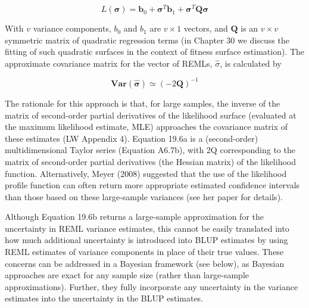 \documentclass{article}
\begin{document}
\begin{equation}
L(\boldsymbol{\sigma})=\mathbf{b}_{0}+\boldsymbol{\sigma}^{T}\mathbf{b}_{1}+\boldsymbol{\sigma}^{T}\mathbf{Q}\boldsymbol{\sigma}
\tag{19.6a}
\label{eq:19_6a}
\end{equation}

With $v$ variance components, $b_0$ and $b_1$ are $v \times 1$ vectors, and $\mathbf{Q}$ is an $v \times v$ symmetric matrix of quadratic regression terms (in Chapter 30 we discuss the fitting of such quadratic surfaces in the context of fitness surface estimation). The approximate covariance matrix for the vector of REMLs, $\widehat{\sigma}$, is calculated by

\begin{equation}
\mathbf{V a r}(\widehat{\boldsymbol{\sigma}})\simeq(-2\mathbf{Q})^{-1}
\tag{19.6b}
\label{eq:19_6b}
\end{equation}

The rationale for this approach is that, for large samples, the inverse of the matrix of second-order partial derivatives of the likelihood surface (evaluated at the maximum likelihood estimate, MLE) approaches the covariance matrix of these estimates (LW Appendix 4). Equation 19.6a is a (second-order) multidimensional Taylor series (Equation A6.7b), with 2Q corresponding to the matrix of second-order partial derivatives (the Hessian matrix) of the likelihood function. Alternatively, Meyer (2008) suggested that the use of the likelihood profile function can often return more appropriate estimated confidence intervals than those based on these large-sample variances (see her paper for details).

Although Equation 19.6b returns a large-sample approximation for the uncertainty in REML variance estimates, this cannot be easily translated into how much additional uncertainty is introduced into BLUP estimates by using REML estimates of variance components in place of their true values. These concerns can be addressed in a Bayesian framework (see below), as Bayesian approaches are exact for any sample size (rather than large-sample approximations). Further, they fully incorporate any uncertainty in the variance estimates into the uncertainty in the BLUP estimates.
\end{document}

